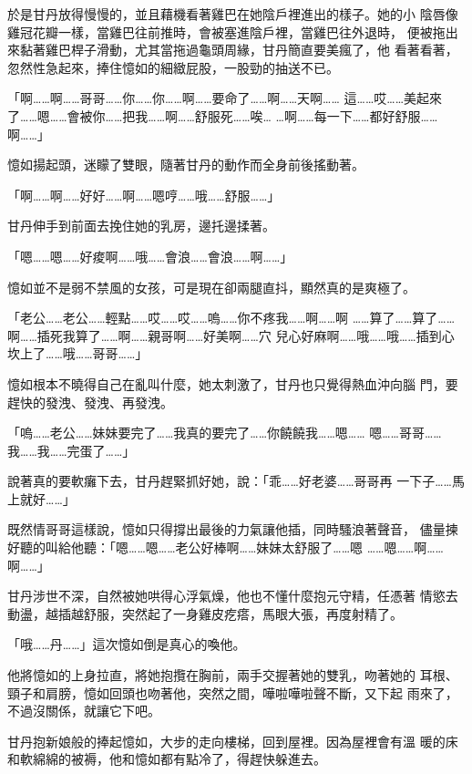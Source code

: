 於是甘丹放得慢慢的，並且藉機看著雞巴在她陰戶裡進出的樣子。她的小
陰唇像雞冠花瓣一樣，當雞巴往前推時，會被塞進陰戶裡，當雞巴往外退時，
便被拖出來黏著雞巴桿子滑動，尤其當拖過龜頭周緣，甘丹簡直要美瘋了，他
看著看著，忽然性急起來，捧住憶如的細緻屁股，一股勁的抽送不已。

「啊……啊……哥哥……你……你……啊……要命了……啊……天啊……
這……哎……美起來了……嗯……會被你……把我……啊……舒服死……唉…
…啊……每一下……都好舒服……啊……」

憶如揚起頭，迷矇了雙眼，隨著甘丹的動作而全身前後搖動著。

「啊……啊……好好……啊……嗯哼……哦……舒服……」

甘丹伸手到前面去挽住她的乳房，邊托邊揉著。

「嗯……嗯……好痠啊……哦……會浪……會浪……啊……」

憶如並不是弱不禁風的女孩，可是現在卻兩腿直抖，顯然真的是爽極了。

「老公……老公……輕點……哎……哎……嗚……你不疼我……啊……啊
……算了……算了……啊……插死我算了……啊……親哥啊……好美啊……穴
兒心好麻啊……哦……哦……插到心坎上了……哦……哥哥……」

憶如根本不曉得自己在亂叫什麼，她太刺激了，甘丹也只覺得熱血沖向腦
門，要趕快的發洩、發洩、再發洩。

「嗚……老公……妹妹要完了……我真的要完了……你饒饒我……嗯……
嗯……哥哥……我……我……完蛋了……」

說著真的要軟癱下去，甘丹趕緊抓好她，說：「乖……好老婆……哥哥再
一下子……馬上就好……」

既然情哥哥這樣說，憶如只得撐出最後的力氣讓他插，同時騷浪著聲音，
儘量揀好聽的叫給他聽：「嗯……嗯……老公好棒啊……妹妹太舒服了……嗯
……嗯……啊……啊……」

甘丹涉世不深，自然被她哄得心浮氣燥，他也不懂什麼抱元守精，任憑著
情慾去動盪，越插越舒服，突然起了一身雞皮疙瘩，馬眼大張，再度射精了。

「哦……丹……」這次憶如倒是真心的喚他。

他將憶如的上身拉直，將她抱攬在胸前，兩手交握著她的雙乳，吻著她的
耳根、頸子和肩膀，憶如回頭也吻著他，突然之間，嘩啦嘩啦聲不斷，又下起
雨來了，不過沒關係，就讓它下吧。

甘丹抱新娘般的捧起憶如，大步的走向樓梯，回到屋裡。因為屋裡會有溫
暖的床和軟綿綿的被褥，他和憶如都有點冷了，得趕快躲進去。










